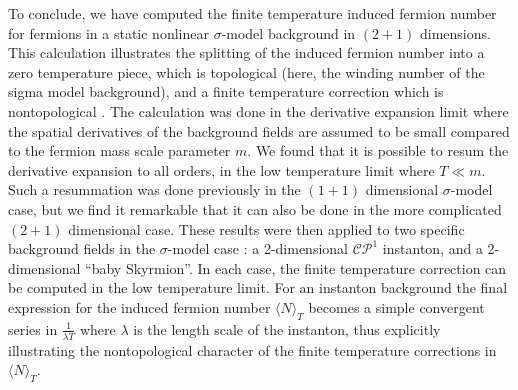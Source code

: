 \documentclass[a4paper,prd]{revtex4}
\begin{document}
To conclude, we have computed the finite temperature induced fermion number for
fermions in a static nonlinear $\sigma$-model background in $(2+1)$ dimensions. This
calculation illustrates the splitting of the induced fermion number into a
zero temperature piece, which is topological (here, the winding number of
the sigma model background), and a finite temperature correction which is
nontopological \cite{dr}. The calculation was done in the derivative
expansion limit where the spatial derivatives of the background fields
are assumed to be small compared to the fermion mass scale parameter $m$.
We found that it is possible to resum the derivative expansion to all
orders, in the low temperature limit where $T\ll m$. Such a resummation
was done previously \cite{ad} in the $(1+1)$ dimensional $\sigma$-model
case, but we find it remarkable that it can also be done in the more
complicated $(2+1)$ dimensional case. These results were then applied to two
specific background fields in the $\sigma$-model case : a 2-dimensional
$\mathcal{CP}^{1}$ instanton, and a 2-dimensional ``baby Skyrmion''. In
each case, the finite temperature correction can be computed in the low
temperature limit. For an instanton background the final expression for
the induced fermion number
$\langle N\rangle _{T}$ becomes a simple convergent series in $\frac{1}{\lambda T}$
where $\lambda$ is the length scale of the instanton, thus explicitly illustrating the
nontopological character of the finite temperature corrections in $\langle N\rangle
_{T}$.  
\end{document}
